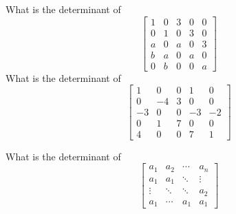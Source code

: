 \bexo
What is the determinant of 
\[
\left[
\begin{array}{ccccc}
1& 0& 3& 0& 0\\
0& 1& 0& 3& 0\\
a& 0& a& 0& 3\\
b& a& 0& a& 0\\
0& b& 0& 0& a
\end{array}
\right]
\]
\eexo{}
\bexo
What is the determinant of 
\[
\left[
\begin{array}{ccccc}
1& 0& 0& 1& 0\\
0& -4& 3& 0& 0\\
-3& 0& 0& -3& -2\\
0& 1& 7& 0& 0\\
4& 0& 0& 7& 1
\end{array}
\right]
\]
\eexo{}

\bexo
What is the determinant of 
\[
\left[
\begin{array}{cccc}
a_1 & a_2 & \cdots & a_n\\
a_1 & a_1 & \ddots & \vdots\\
\vdots & \ddots & \ddots & a_2\\
a_1 & \cdots & a_1 & a_1
\end{array}
\right]
\]
\eexo{}
